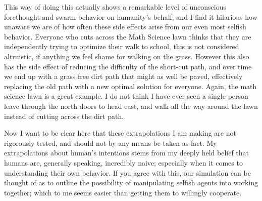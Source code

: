 \documentclass[conference]{IEEEtran}
\begin{document}
This way of doing this actually shows a remarkable level of unconscious forethought and swarm behavior on humanity's behalf, and I find it hilarious how unaware we are of how often these side effects arise from our even most selfish behavior. Everyone who cuts across the Math Science lawn thinks that they are independently trying to optimize their walk to school, this is not considered altruistic, if anything we feel shame for walking on the grass. However this also has the side effect of reducing the difficulty of the short-cut path, and over time we end up with a grass free dirt path that might as well be paved, effectively replacing the old path with a new optimal solution for everyone. Again, the math science lawn is a great example. I do not think I have ever seen a single person leave through the north doors to head east, and walk all the way around the lawn instead of cutting across the dirt path. 

Now I want to be clear here that these extrapolations I am making are not rigorously tested, and should not by any means be taken as fact. My extrapolations about human's intentions stems from my deeply held belief that humans are, generally speaking, incredibly naive; especially when it comes to understanding their own behavior. If you agree with this, our simulation can be thought of as to outline the possibility of manipulating selfish agents into working together; which to me seems easier than getting them to willingly cooperate. 

%
%
\end{document}
